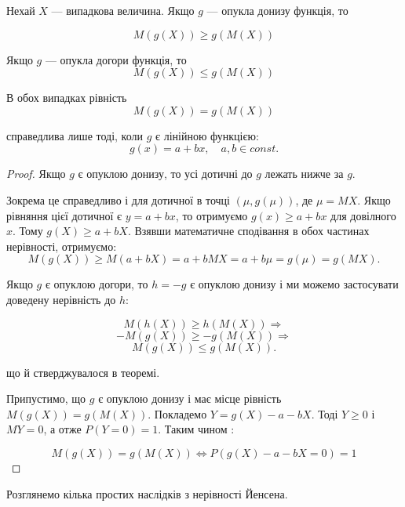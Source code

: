 \begin{theorem}
    Нехай $X$ --- випадкова величина. Якщо $g$ --- опукла
    донизу функція, то
    
    \begin{equation}
        M(g(X)) \geqslant g(M(X))
    \end{equation}
    
    Якщо $g$ --- опукла догори функція, то
    \begin{equation}
        M(g(X)) \leqslant g(M(X))
    \end{equation}
    
    В обох випадках рівність 
    $$M(g(X)) = g(M(X))$$
    
    справедлива лише тоді, коли $g$ є лінійною
    функцією:
    $$g(x) = a + bx, \quad a, b \in const.$$
\end{theorem}
\begin{proof}
    Якщо $g$ є опуклою донизу, то усі дотичні
    до $g$ лежать нижче за $g$.
    \beautifulImage
    
    Зокрема це справедливо і для дотичної в
    точці $(\mu, g(\mu))$, де $\mu = MX$.
    Якщо рівняння цієї дотичної є $y = a + bx$, 
    то отримуємо $g(x) \geqslant a + bx$ для
    довілного $x$.
    Тому $g(X) \geqslant a + bX$.
    Взявши математичне сподівання в обох
    частинах нерівності, отримуємо:
    $$M(g(X)) \geqslant M(a + bX) = a + bMX = a + b\mu = g(\mu) = g(MX).$$
    
    Якщо $g$ є опуклою догори, то $h = -g$ є опуклою донизу і ми
    можемо застосувати доведену нерівність до $h$:
    
    $$M(h(X)) \geqslant h(M(X)) \Rightarrow $$
    $$-M(g(X)) \geqslant -g(M(X)) \Rightarrow $$
    $$M(g(X)) \leqslant g(M(X)).$$
    
    що й стверджувалося в теоремі.
    
    Припустимо, що $g$ є опуклою донизу
    і має місце рівність $M(g(X)) = g(M(X))$.
    Покладемо $Y = g(X) - a - bX$.
    Тоді $Y \geqslant 0$ і $MY = 0$, а отже $P(Y=0) = 1$.
    Таким чином : 
    
    $$M(g(X)) = g(M(X)) \Leftrightarrow P(g(X) - a -bX = 0) = 1$$
\end{proof}

Розглянемо кілька простих наслідків з нерівності Йенсена.

